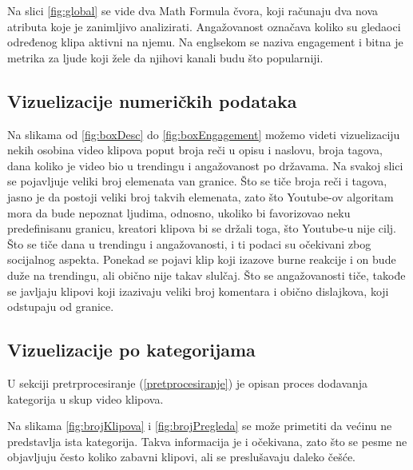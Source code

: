 \documentclass[a4paper]{article}
\theoremstyle{definition}
\begin{document}
Na slici \ref{fig:global} se vide dva Math Formula čvora, koji računaju dva nova atributa koje je zanimljivo analizirati.
Angažovanost označava koliko su gledaoci određenog klipa aktivni na njemu. Na englsekom se naziva engagement i
bitna je metrika za ljude koji žele da njihovi kanali budu što popularniji.


\subsection{Vizuelizacije numeričkih podataka}

Na slikama od \ref{fig:boxDesc} do \ref{fig:boxEngagement} možemo videti vizuelizaciju nekih osobina video klipova poput broja reči u opisu i naslovu, broja tagova, dana koliko je video bio u trendingu i angažovanost po državama. Na svakoj slici se pojavljuje veliki broj elemenata van granice. Što se tiče broja reči i tagova, jasno je da postoji veliki broj takvih elemenata, zato što Youtube-ov algoritam mora da bude nepoznat ljudima, odnosno, ukoliko bi favorizovao neku predefinisanu granicu, kreatori klipova bi se držali toga, što Youtube-u nije cilj.
\\
Što se tiče dana u trendingu i angažovanosti, i ti podaci su očekivani zbog socijalnog aspekta. Ponekad se pojavi klip koji izazove burne reakcije i on bude duže na trendingu, ali obično nije takav slulčaj. Što se angažovanosti tiče, takođe se javljaju klipovi koji izazivaju veliki broj komentara i obično dislajkova, koji odstupaju od granice.

\subsection{Vizuelizacije po kategorijama}

U sekciji pretrprocesiranje (\ref{pretprocesiranje}) je opisan proces dodavanja kategorija u skup video klipova.

Na slikama \ref{fig:brojKlipova} i \ref{fig:brojPregleda} se može primetiti da većinu ne predstavlja ista kategorija. Takva informacija je i očekivana, zato što se pesme ne objavljuju često koliko zabavni klipovi, ali se preslušavaju daleko češće.

\end{document}
